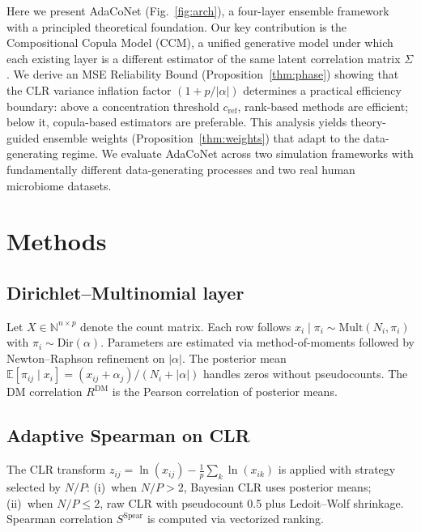 \documentclass[unnumsec,webpdf,contemporary,large,numbered]{oup-authoring-template}
\theoremstyle{plain}
\theoremstyle{definition}
\newcommand{\E}{\mathbb{E}}
\begin{document}
Here we present AdaCoNet (Fig.~\ref{fig:arch}), a four-layer ensemble framework with a principled theoretical foundation. Our key contribution is the Compositional Copula Model (CCM), a unified generative model under which each existing layer is a different estimator of the same latent correlation matrix $\Sigma$. We derive an MSE Reliability Bound (Proposition~\ref{thm:phase}) showing that the CLR variance inflation factor $(1 + p/|\alpha|)$ determines a practical efficiency boundary: above a concentration threshold $c_{\text{ref}}$, rank-based methods are efficient; below it, copula-based estimators are preferable. This analysis yields theory-guided ensemble weights (Proposition~\ref{thm:weights}) that adapt to the data-generating regime. We evaluate AdaCoNet across two simulation frameworks with fundamentally different data-generating processes and two real human microbiome datasets.


\section{Methods}\label{sec:methods}

\subsection{Dirichlet--Multinomial layer}\label{ssec:dm}

Let $X \in \mathbb{N}^{n \times p}$ denote the count matrix. Each row follows $x_i \mid \pi_i \sim \text{Mult}(N_i, \pi_i)$ with $\pi_i \sim \text{Dir}(\alpha)$. Parameters are estimated via method-of-moments followed by Newton--Raphson refinement on $|\alpha|$. The posterior mean $\E[\pi_{ij} \mid x_i] = (x_{ij} + \alpha_j)/(N_i + |\alpha|)$ handles zeros without pseudocounts. The DM correlation $R^{\text{DM}}$ is the Pearson correlation of posterior means.

\subsection{Adaptive Spearman on CLR}\label{ssec:spearman}

The CLR transform $z_{ij} = \ln(x_{ij}) - \frac{1}{p}\sum_k \ln(x_{ik})$ is applied with strategy selected by $N/P$: (i)~when $N/P > 2$, Bayesian CLR uses posterior means; (ii)~when $N/P \leq 2$, raw CLR with pseudocount 0.5 plus Ledoit--Wolf shrinkage. Spearman correlation $S^{\text{Spear}}$ is computed via vectorized ranking.
\end{document}
